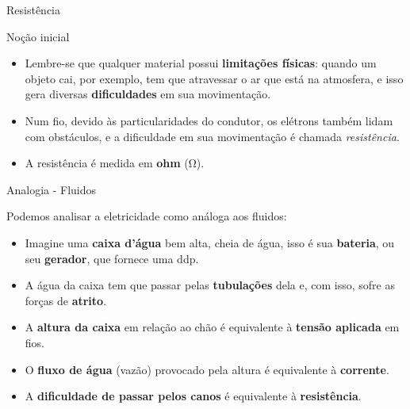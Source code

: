 \begin{frame}{Resistência}
	\begin{block}{Noção inicial}
		\begin{itemize}
			\item Lembre-se que qualquer material possui \textbf{limitações físicas}: quando um objeto cai, por exemplo, tem que atravessar o ar que está na atmosfera, e isso gera diversas \textbf{dificuldades} em sua movimentação.
			\item Num fio, devido às particularidades do condutor, os elétrons também lidam com obstáculos, e a dificuldade em sua movimentação é chamada \textit{resistência}.
			\item A resistência é medida em \textbf{ohm} (\si{\ohm}).
		\end{itemize}
	\end{block}
\end{frame}


\begin{frame}{Analogia - Fluidos}
	\begin{block}{}
		Podemos analisar a eletricidade como análoga aos fluidos:
		\begin{itemize}
			\item Imagine uma \textbf{caixa d'água} bem alta, cheia de água, isso é sua \textbf{bateria}, ou seu \textbf{gerador}, que fornece uma ddp.
			\item A água da caixa tem que passar pelas \textbf{tubulações} dela e, com isso, sofre as forças de \textbf{atrito}.
			\item A \textbf{altura da caixa} em relação ao chão é equivalente à \textbf{tensão aplicada} em fios.
			\item O \textbf{fluxo de água} (vazão) provocado pela altura é equivalente à \textbf{corrente}.
			\item A \textbf{dificuldade de passar pelos canos} é equivalente à \textbf{resistência}.
		\end{itemize}
	\end{block}
\end{frame}


